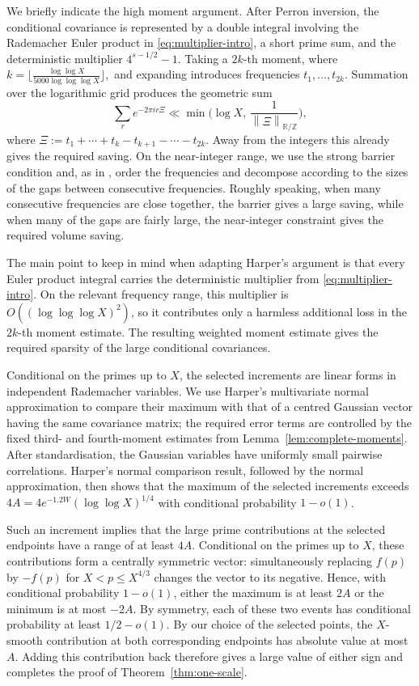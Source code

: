 \documentclass[a4paper,12pt,reqno]{amsart}
\numberwithin{equation}{section}
\theoremstyle{remark}
\begin{document}
We briefly indicate the high moment argument. After Perron inversion, the
conditional covariance is represented by a double integral involving the
Rademacher Euler product in \eqref{eq:multiplier-intro}, a short prime sum,
and the deterministic multiplier \(4^{s-1/2}-1\).
Taking a \(2k\)-th moment, where
\(
 k=\big\lfloor
 \frac{\log\log X}{5000\log\log\log X}
 \big\rfloor,
\)
and expanding introduces frequencies \(t_1,\ldots,t_{2k}\). Summation over
the logarithmic grid produces the geometric sum
\[
 \sum_r
 e^{-2\pi i r\Xi}
 \ll
 \min\bigg(
 \log X,\,
 \frac{1}{
 \left\| \Xi
 \right\|_{\mathbb R/\mathbb Z}}
 \bigg),
\]
where $ \Xi:=t_1+\cdots+t_k-t_{k+1}-\cdots-t_{2k}$.
Away from the integers this already gives the required saving. On the near-integer range, we use the strong barrier condition and, as in
\cite[Sections~3.3--3.4]{Harper2023Large}, order the frequencies and decompose according to the sizes of the gaps between consecutive
frequencies. Roughly speaking, when many consecutive frequencies are close together, the barrier gives a large saving, while when many of the gaps are fairly large, the near-integer constraint gives the required
volume saving.

The main point to keep in mind when adapting Harper's argument is that every
Euler product integral carries the deterministic multiplier from
\eqref{eq:multiplier-intro}. On the relevant frequency range, this
multiplier is \(O((\log\log\log X)^2)\), so it contributes only a harmless
additional loss in the \(2k\)-th moment estimate. The resulting weighted
moment estimate gives the required sparsity of the large conditional
covariances.

Conditional on the primes up to \(X\), the selected increments are
linear forms in independent Rademacher variables. We use Harper's
multivariate normal approximation to compare their maximum with that of a
centred Gaussian vector having the same covariance matrix; the required
error terms are controlled by the fixed third- and fourth-moment estimates
from Lemma~\ref{lem:complete-moments}. After standardisation, the Gaussian
variables have uniformly small pairwise correlations. Harper's normal
comparison result, followed by the normal approximation, then shows that
the maximum of the selected increments exceeds
\(
 {4A}=4e^{-1.2W}(\log\log X)^{1/4}
\)
with conditional probability \(1-o(1)\).


Such an increment implies that the large prime contributions at the selected endpoints have a range of at least
\({4A}\). Conditional on the primes up to \(X\),
these contributions form a centrally symmetric vector: simultaneously
replacing \(f(p)\) by \(-f(p)\) for \(X<p\leq X^{4/3}\) changes the vector
to its negative. Hence, with conditional probability \(1-o(1)\), either
the maximum is at least
\({2A}\) or the minimum is at most
\({-2A}\). By symmetry, each of these two events
has conditional probability at least \(1/2-o(1)\).
By our choice of the selected points, the \(X\)-smooth contribution at
both corresponding endpoints has absolute value at most
\({A}\). Adding this contribution back therefore
gives a large value of either sign and completes the proof of
Theorem~\ref{thm:one-scale}.
\end{document}
